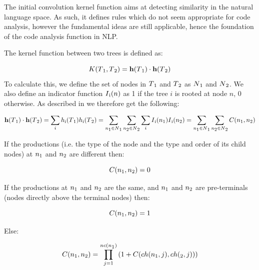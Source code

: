 The initial convolution kernel function aims at detecting similarity in the
natural language space. As such, it defines rules which do not seem
appropriate for code analysis, however the fundamental ideas are still applicable,
hence the foundation of the code analysis function in NLP.

The kernel function between two trees is defined as:

\begin{equation}
K(T\textsubscript{1}, T\textsubscript{2}) = \mathbf{h}(T\textsubscript{1})
\cdot \mathbf{h}(T\textsubscript{2})
\end{equation}
To calculate this, we define the set of nodes in $T\textsubscript{1}$ and 
$T\textsubscript{2}$ as $N\textsubscript{1}$ and $N\textsubscript{2}$. We
also define an indicator function $I\textsubscript{i}(n)$ as 1 if the 
tree $i$ is rooted at node $n$, 0 otherwise. As described in \cite{NLPKernel}
we therefore get the following:

\begin{equation}
\textbf{h}(T\textsubscript{1}) \cdot \textbf{h}(T\textsubscript{2}) =
\sum_{i}{h\textsubscript{i}(T\textsubscript{1})h\textsubscript{i}(T\textsubscript{2})} =
\sum_{n\textsubscript{1}\in N\textsubscript{1}} \sum_{n\textsubscript{2} \in N\textsubscript{2}}
\sum_{i}{I\textsubscript{i}(n\textsubscript{1})I\textsubscript{i}(n\textsubscript{2})} =
\sum_{n\textsubscript{1}\in N\textsubscript{1}} \sum_{n\textsubscript{2} \in N\textsubscript{2}}
{C(n\textsubscript{1}, n\textsubscript{2})}
\end{equation}

If the productions (i.e. the type of the node and the type and order of its 
child nodes) at $n\textsubscript{1}$ and $n\textsubscript{2}$ are different
then:

\begin{equation}
C(n\textsubscript{1}, n\textsubscript{2}) = 0
\end{equation}

If the productions at $n\textsubscript{1}$ and $n\textsubscript{2}$ are the same,
and $n\textsubscript{1}$ and $n\textsubscript{2}$ are pre-terminals (nodes directly
above the terminal nodes) then:

\begin{equation}
C(n\textsubscript{1}, n\textsubscript{2}) = 1
\end{equation}

Else:

\begin{equation}
C(n\textsubscript{1}, n\textsubscript{2}) = \prod_{j=1}^{nc(n\textsubscript{1})}
{(1+C(ch(n\textsubscript{1}, j), ch(\textsubscript{2}, j)))}
\end{equation}


